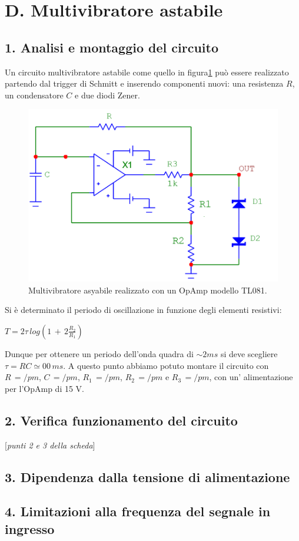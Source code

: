 \documentclass[10pt,a4paper]{article}
\newcommand{\rem}[1]{[\emph{#1}]}
\begin{document}
\section*{D. Multivibratore astabile}
\subsection*{1. Analisi e montaggio del circuito}

Un circuito multivibratore astabile come quello in figura\ref{circuito4} può essere realizzato partendo dal trigger di Schmitt e inserendo componenti nuovi: una resistenza $R$, un condensatore $C$ e due diodi Zener.\\
\begin{figure}[h]
\centering
\includegraphics[scale=0.5]{multivibratoreAstabile.png}
\caption{Multivibratore asyabile realizzato con un OpAmp modello TL081.\label{circuito4}}
\end{figure}

Si è determinato il periodo di oscillazione in funzione degli elementi resistivi: 
\begin{center}
$T=2\tau\, log\left( 1\,+\,2\frac{R_2}{R_1}\right)$ 
\end{center}
Dunque per ottenere un periodo dell'onda quadra di $\sim 2ms$ si deve scegliere $\tau = RC\simeq 00\,ms$.
A questo punto abbiamo potuto montare il circuito con $R\,= /pm $, $C\,= /pm $, $R_1\,= /pm $, $R_2\,= /pm $ e $R_3\,= /pm $, con un' alimentazione per l'OpAmp di 15 V.\\

\subsection*{2. Verifica funzionamento del circuito}
\rem{punti 2 e 3 della scheda}\\




\subsection*{3. Dipendenza dalla tensione di alimentazione}


\subsection*{4. Limitazioni alla frequenza del segnale in ingresso}





 
\end{document}
